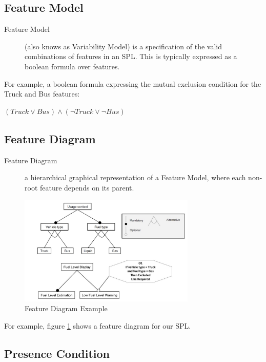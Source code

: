 \documentclass[11pt]{article}
\begin{document}
\subsection{Feature Model}

\begin{description}

\item[Feature Model]
(also knows as Variability Model) is a specification of the valid combinations of features in an SPL. This is typically expressed as a boolean formula over features.

\end{description}

For example, a boolean formula expressing the mutual exclusion condition for the Truck and Bus features:

$(Truck \vee Bus) \wedge (\neg Truck \vee \neg Bus) $

\subsection{Feature Diagram}

\begin{description}

\item[Feature Diagram]
a hierarchical graphical representation of a Feature Model, where each non-root feature depends on its parent.

\end{description}

\begin{figure}
  \centering
    \includegraphics[width=0.75\textwidth]{FeatureDiagram}
  \caption{Feature Diagram Example}
  \label{fig:FeatureDiagram}
\end{figure}

For example, figure \ref{fig:FeatureDiagram} shows a feature diagram for our SPL.

\subsection{Presence Condition}
\end{document}
